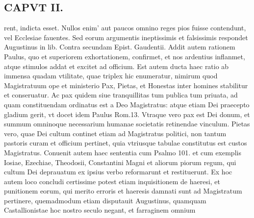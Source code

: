 \documentclass{article}
\begin{document}
\begin{pages}
\section*{CAPVT  II. }
\marginpar{[ p.49 ]}\pstart rent, indicta esset. Nullos enim' aut paucos omnino reges pios fuisse contendunt, vel Ecclesiae fauentes. Sed eorum argumentis ineptissimis et falsissimis respondet Augustinus in lib.  Contra secundam Epist. Gaudentii. Addit autem rationem Paulus, quo et superiorem exhortationem, confirmet, et nos ardentius inflanmet, atque stimulos addat et excitet ad officium. Est autem ducta haec ratio ab immensa quadam vtilitate, quae triplex hic enumeratur, nimirum quod Magistratuum ope et ministerio Pax, Pietas, et Honestas inter homines stabilitur et conseruatur. Ac pax quidem siue tranquillitas tum publica tum priuata, ad quam constituendam ordinatus est a Deo Magistratus: atque etiam Dei praecepto gladium gerit, vt docet idem Paulus Rom.13. Vtraque vero pax est Dei donum, et summum omninoque necessarium humanae societatis retinendae vinculum. Pietas vero, quae Dei cultum continet etiam ad Magistratus politici, non tantum pastoris curam et officium pertinet, quia vtriusque tabulae constitutus est custos Magistratus. Conuenit autem haec sententia cum Psalmo 101. et cum exemplis Iosiae, Ezechiae, Theodosii, Constantini Magni et aliorum piorum regum, qui cultum Dei deprauatum ex ipsius verbo reformarunt et restituerunt. Ex hoc autem loco concludi certissime potest etiam inquisitionem de haeresi, et punitionem eorum, qui merito erroris et haeresis damnati sunt ad Magistratum pertinere, quemadmodum etiam disputauit Augustinus, quamquam Castallionistae hoc nostro seculo negant, et farraginem omnium\pend

\end{pages}
\end{document}
